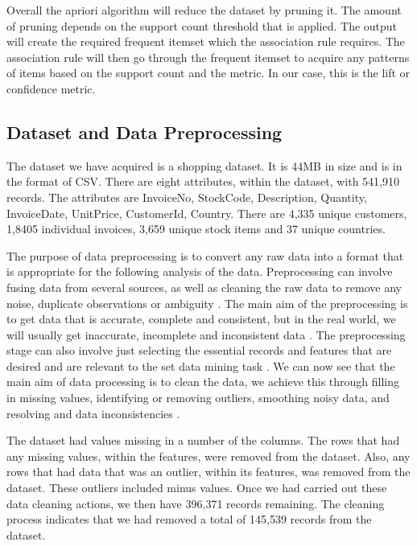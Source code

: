 \documentclass[a4paper,10pt]{article}
\begin{document}
Overall the apriori algorithm will reduce the dataset by pruning it. The amount of pruning depends on the support count threshold that is applied. The output will create the required frequent itemset which the association rule requires. The association rule will then go through the frequent itemset to acquire any patterns of items based on the support count and the metric. In our case, this is the lift or confidence metric.

\subsection{Dataset and Data Preprocessing}

The dataset we have acquired is a shopping dataset. It is 44MB in size and is in the format of CSV. There are eight attributes, within the dataset, with 541,910 records. The attributes are InvoiceNo, StockCode, Description, Quantity, InvoiceDate, UnitPrice, CustomerId, Country. There are 4,335 unique customers, 1,8405 individual invoices, 3,659 unique stock items and 37 unique countries. 

The purpose of data preprocessing is to convert any raw data into a format that is appropriate for the following analysis of the data. Preprocessing can involve fusing data from several sources, as well as cleaning the raw data to remove any noise, duplicate observations or ambiguity \cite{tan2016introduction}. The main aim of the preprocessing is to get data that is accurate, complete and consistent, but in the real world, we will usually get inaccurate, incomplete and inconsistent data \cite{han2011data}. The preprocessing stage can also involve just selecting the essential records and features that are desired and are relevant to the set data mining task \cite{tan2016introduction}. We can now see that the main aim of data processing is to clean the data, we achieve this through filling in missing values, identifying or removing outliers, smoothing noisy data, and resolving and data inconsistencies \cite{han2011data}.

The dataset had values missing in a number of the columns. The rows that had any missing values, within the features, were removed from the dataset. Also, any rows that had data that was an outlier, within its features, was removed from the dataset. These outliers included minus values. Once we had carried out these data cleaning actions, we then have 396,371 records remaining. The cleaning process indicates that we had removed a total of 145,539 records from the dataset. 
\end{document}
